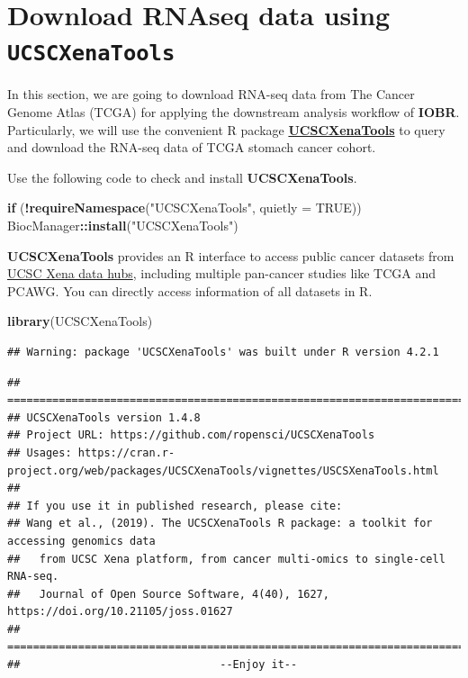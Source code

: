 \documentclass[
  12pt,
]{book}
\newenvironment{Shaded}{\begin{snugshade}}{\end{snugshade}}
\newcommand{\AttributeTok}[1]{\textcolor[rgb]{0.13,0.29,0.53}{#1}}
\newcommand{\ConstantTok}[1]{\textcolor[rgb]{0.56,0.35,0.01}{#1}}
\newcommand{\ControlFlowTok}[1]{\textcolor[rgb]{0.13,0.29,0.53}{\textbf{#1}}}
\newcommand{\FunctionTok}[1]{\textcolor[rgb]{0.13,0.29,0.53}{\textbf{#1}}}
\newcommand{\NormalTok}[1]{#1}
\newcommand{\SpecialCharTok}[1]{\textcolor[rgb]{0.81,0.36,0.00}{\textbf{#1}}}
\newcommand{\StringTok}[1]{\textcolor[rgb]{0.31,0.60,0.02}{#1}}
\begin{document}
\hypertarget{download-rnaseq-data-using-ucscxenatools}{%
\section{\texorpdfstring{Download RNAseq data using \texttt{UCSCXenaTools}}{Download RNAseq data using UCSCXenaTools}}\label{download-rnaseq-data-using-ucscxenatools}}

In this section, we are going to download RNA-seq data from The Cancer Genome Atlas (TCGA) for applying the downstream analysis workflow of \textbf{IOBR}. Particularly, we will use the convenient R package \href{https://cran.r-project.org/web/packages/UCSCXenaTools/vignettes/USCSXenaTools.html}{\textbf{UCSCXenaTools}} to query and download the RNA-seq data of TCGA stomach cancer cohort.

Use the following code to check and install \textbf{UCSCXenaTools}.

\begin{Shaded}
\begin{Highlighting}[]
\ControlFlowTok{if}\NormalTok{ (}\SpecialCharTok{!}\FunctionTok{requireNamespace}\NormalTok{(}\StringTok{"UCSCXenaTools"}\NormalTok{, }\AttributeTok{quietly =} \ConstantTok{TRUE}\NormalTok{))  }
\NormalTok{  BiocManager}\SpecialCharTok{::}\FunctionTok{install}\NormalTok{(}\StringTok{"UCSCXenaTools"}\NormalTok{)}
\end{Highlighting}
\end{Shaded}

\textbf{UCSCXenaTools} provides an R interface to access public cancer datasets from \href{https://xenabrowser.net/datapages/}{UCSC Xena data hubs}, including multiple pan-cancer studies like TCGA and PCAWG. You can directly access information of all datasets in R.

\begin{Shaded}
\begin{Highlighting}[]
\FunctionTok{library}\NormalTok{(UCSCXenaTools)}
\end{Highlighting}
\end{Shaded}

\begin{verbatim}
## Warning: package 'UCSCXenaTools' was built under R version 4.2.1
\end{verbatim}

\begin{verbatim}
## =========================================================================================
## UCSCXenaTools version 1.4.8
## Project URL: https://github.com/ropensci/UCSCXenaTools
## Usages: https://cran.r-project.org/web/packages/UCSCXenaTools/vignettes/USCSXenaTools.html
## 
## If you use it in published research, please cite:
## Wang et al., (2019). The UCSCXenaTools R package: a toolkit for accessing genomics data
##   from UCSC Xena platform, from cancer multi-omics to single-cell RNA-seq.
##   Journal of Open Source Software, 4(40), 1627, https://doi.org/10.21105/joss.01627
## =========================================================================================
##                               --Enjoy it--
\end{verbatim}
\end{document}
